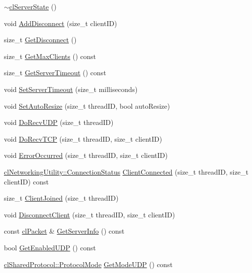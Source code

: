 \begin{DoxyCompactItemize}
\item 
\hyperlink{classcl_server_state_aecbd792cf629712b55a673406c2111e9}{$\sim$clServerState} ()
\item 
void \hyperlink{classcl_server_state_aa20c329aee577aefe77e3a8b9c517686}{AddDisconnect} (size\_\-t clientID)
\item 
size\_\-t \hyperlink{classcl_server_state_a1823d201b34aa75de541a7c14bd1d774}{GetDisconnect} ()
\item 
size\_\-t \hyperlink{classcl_server_state_a78cca781121c231c27b705ac04aa90c3}{GetMaxClients} () const 
\item 
size\_\-t \hyperlink{classcl_server_state_a8aa76c5f0ae3202e74f3c85bb62a1710}{GetServerTimeout} () const 
\item 
void \hyperlink{classcl_server_state_afc302a2ceb465e93a8e1396c1c69978d}{SetServerTimeout} (size\_\-t milliseconds)
\item 
void \hyperlink{classcl_server_state_a0c6c0c0c2db0181c66945c649ff016d4}{SetAutoResize} (size\_\-t threadID, bool autoResize)
\item 
void \hyperlink{classcl_server_state_a4cb4d04f8f9d0292b406a633fdf4aaf1}{DoRecvUDP} (size\_\-t threadID)
\item 
void \hyperlink{classcl_server_state_a692ed17b33921c31f87941b2c95bf99a}{DoRecvTCP} (size\_\-t threadID, size\_\-t clientID)
\item 
void \hyperlink{classcl_server_state_ad484dd6b0de0014bafe361ba4b8aa19a}{ErrorOccurred} (size\_\-t threadID, size\_\-t clientID)
\item 
\hyperlink{classcl_networking_utility_a15dd34683154e07d5843f8f5432fec6d}{clNetworkingUtility::ConnectionStatus} \hyperlink{classcl_server_state_a74388f1a87e39ae71a67a796ed61da11}{ClientConnected} (size\_\-t threadID, size\_\-t clientID) const 
\item 
size\_\-t \hyperlink{classcl_server_state_a8d559d88c2635a34110063c408b4440e}{ClientJoined} (size\_\-t threadID)
\item 
void \hyperlink{classcl_server_state_ab595d445807ac565db31e922b22d58f8}{DisconnectClient} (size\_\-t threadID, size\_\-t clientID)
\item 
const \hyperlink{classcl_packet}{clPacket} \& \hyperlink{classcl_server_state_a31a4202c942e75d35bc5cfd325e383fd}{GetServerInfo} () const 
\item 
bool \hyperlink{classcl_server_state_ad0e980f5aa1e93270092d67412aa2684}{GetEnabledUDP} () const 
\item 
\hyperlink{classcl_shared_protocol_a4b0b9c82b8ae4eee78c6308c35afd47b}{clSharedProtocol::ProtocolMode} \hyperlink{classcl_server_state_aa2bbcc834edc34008fa234a62e70e72c}{GetModeUDP} () const 

\end{DoxyCompactItemize}
